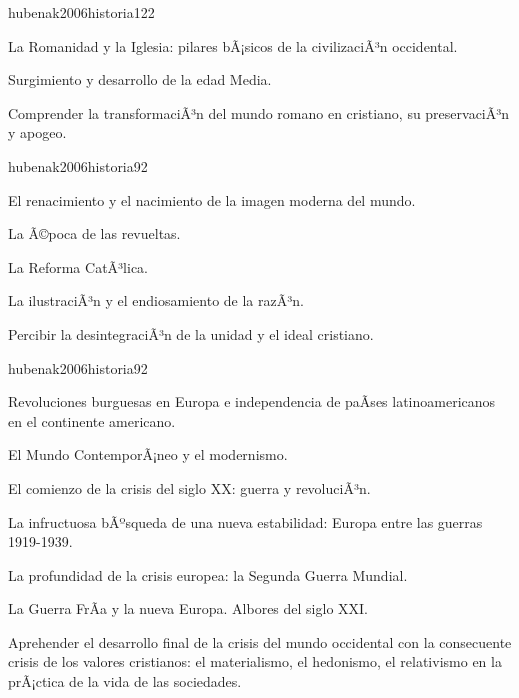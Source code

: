 \begin{syllabus}
\begin{unit}{}{hubenak2006historia}{12}{2}
\begin{topics}
	\item La Romanidad y la Iglesia: pilares bÃ¡sicos de la civilizaciÃ³n occidental. 	
	\item Surgimiento y desarrollo de la edad Media.
\end{topics}
\begin{unitgoals}
	\item Comprender la transformaciÃ³n del mundo romano en cristiano, su preservaciÃ³n y apogeo.
\end{unitgoals}
\end{unit}

\begin{unit}{}{hubenak2006historia}{9}{2}
\begin{topics}
	\item El renacimiento y el nacimiento de la imagen moderna del mundo.  	
	\item La Ã©poca de las revueltas. 	
	\item La Reforma CatÃ³lica. 	
	\item La ilustraciÃ³n y el endiosamiento de la razÃ³n. 
\end{topics}
\begin{unitgoals}
	\item Percibir la desintegraciÃ³n de la unidad y el ideal cristiano.
\end{unitgoals}
\end{unit}

\begin{unit}{}{hubenak2006historia}{9}{2}
\begin{topics}
	\item Revoluciones burguesas en Europa e independencia de paÃ­ses latinoamericanos en el continente americano. 	
	\item El Mundo ContemporÃ¡neo y el modernismo. 	
	\item El comienzo de la crisis del siglo XX: guerra y revoluciÃ³n. 	
	\item La infructuosa bÃºsqueda de una nueva estabilidad: Europa entre las guerras 1919-1939. 	
	\item La profundidad de la crisis europea: la Segunda Guerra Mundial. 	
	\item La Guerra FrÃ­a y la nueva Europa. Albores del siglo XXI.
\end{topics}
\begin{unitgoals}
	\item Aprehender el desarrollo final de la crisis del mundo occidental con la consecuente crisis de los valores cristianos: el materialismo, el hedonismo, el relativismo en la prÃ¡ctica de la vida de las sociedades. 
\end{unitgoals}
\end{unit}


\end{syllabus}
